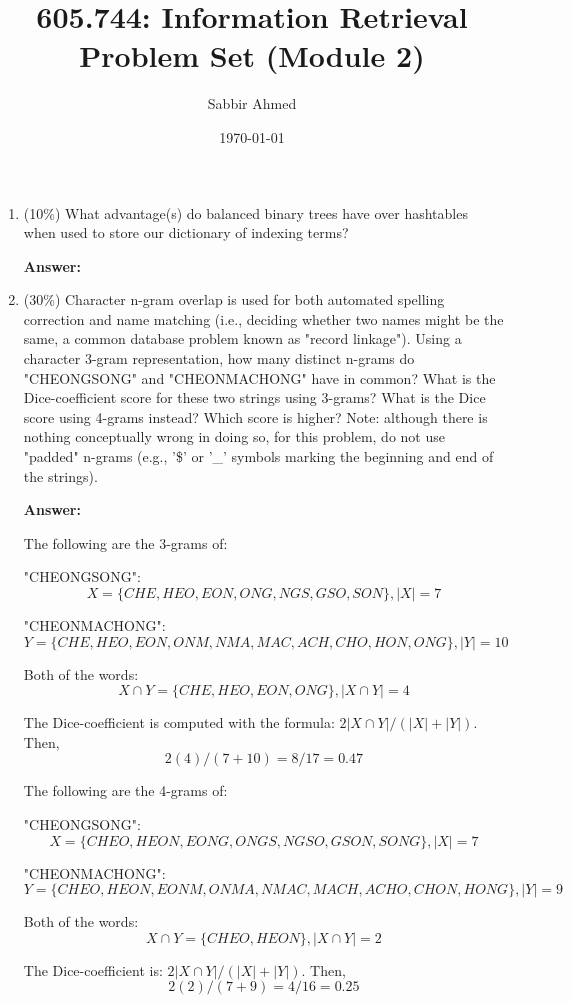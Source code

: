 \documentclass[11pt]{article}
\title{605.744: Information Retrieval \\ Problem Set (Module 2)}
\author{Sabbir Ahmed}
\date{\today}
\begin{document}
\maketitle	

    \begin{enumerate}

        \item (10\%) What advantage(s) do balanced binary trees have over hashtables when used to store our dictionary of indexing terms?

        \textbf{Answer:}

        \item (30\%) Character n-gram overlap is used for both automated spelling correction and name matching (i.e., deciding whether two names might be the same, a common database problem known as "record linkage"). Using a character 3-gram representation, how many distinct n-grams do "CHEONGSONG" and "CHEONMACHONG" have in common? What is the Dice-coefficient score for these two strings using 3-grams? What is the Dice score using 4-grams instead? Which score is higher? Note: although there is nothing conceptually wrong in doing so, for this problem, do not use "padded" n-grams (e.g., '\$' or '\_' symbols marking the beginning and end of the strings).

        \textbf{Answer:}
        
        The following are the 3-grams of:
        
        "CHEONGSONG": \[ X = \{CHE, HEO, EON, ONG, NGS, GSO, SON\}, |X| = 7 \]

        "CHEONMACHONG": \[ Y = \{CHE, HEO, EON, ONM, NMA, MAC, ACH, CHO, HON, ONG\}, |Y| = 10 \]

        Both of the words: \[ X \cap Y = \{CHE, HEO, EON, ONG\}, |X \cap Y| = 4 \]

        The Dice-coefficient is computed with the formula: $2|X \cap Y| / (|X|+|Y|)$. Then, \[ 2(4) / (7 + 10) = 8 / 17 = 0.47 \]

        The following are the 4-grams of:
        
        "CHEONGSONG": \[ X = \{CHEO, HEON, EONG, ONGS, NGSO, GSON, SONG\}, |X| = 7 \]

        "CHEONMACHONG": \[ Y = \{CHEO, HEON, EONM, ONMA, NMAC, MACH, ACHO, CHON, HONG\}, |Y| = 9 \]

        Both of the words: \[ X \cap Y = \{CHEO, HEON\}, |X \cap Y| = 2 \]

        The Dice-coefficient is: $2|X \cap Y| / (|X|+|Y|)$. Then, \[ 2(2) / (7 + 9) = 4 / 16 = 0.25 \]


\end{enumerate}
\end{document}

